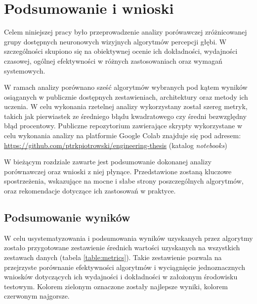 \chapter{Podsumowanie i wnioski}\label{chap:podsumowanie_i_wnioski}
Celem niniejszej pracy było przeprowadzenie analizy porówawczej zróżnicowanej grupy dostępnych neuronowych wizyjnych algorytmów percepcji głębi. W szczególności skupiono się na obiektywnej ocenie ich dokładności, wydajności czasowej, ogólnej efektywności w różnych zastosowaniach oraz wymagań systemowych.

W ramach analizy porównano sześć algorytmów wybranych pod kątem wyników osiąganych w publicznie dostępnych zestawieniach, architektury oraz metody ich uczenia. W celu wykonania rzetelnej analizy wykorzystany został szereg metryk, takich jak pierwiastek ze średniego błądu kwadratowego czy średni bezwzględny błąd procentowy. Publiczne repozytorium zawierające skrypty wykorzystane w celu wykonania analizy na platformie Google Colab znajduje się pod adresem:
\url{https://github.com/ptrkpiotrowski/engineering-thesis} (katalog \textit{notebooks})

W bieżącym rozdziale zawarte jest podsumowanie dokonanej analizy porównawczej oraz wnioski z niej płynące. Przedstawione zostaną kluczowe spostrzeżenia, wskazujące na mocne i słabe strony poszczególnych algorytmów, oraz rekomendacje dotyczące ich zastosowań w praktyce.

\section{Podsumowanie wyników}
W celu usystematyzowania i podsumowania wyników uzyskanych przez algorytmy zostało przygotowane zestawienie średnich wartości uzyskanych na wszystkich zestawach danych (tabela \ref{table:metrics}). Takie zestawienie pozwala na przejrzyste porównanie efektywności algorytmów i wyciągnięcie jednoznacznych wniosków dotyczących ich wydajności i dokładności w założonym środowisku testowym. Kolorem zielonym oznaczone zostały najlepsze wyniki, kolorem czerwonym najgorsze.

